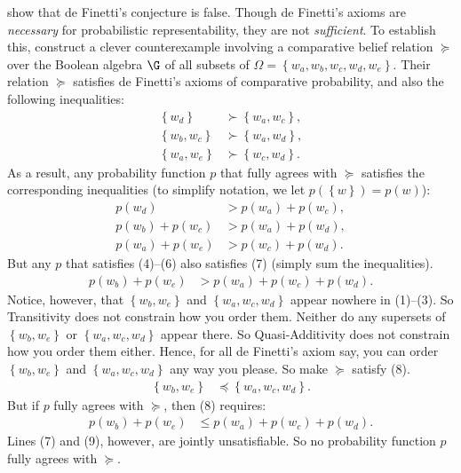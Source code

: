 \citet{Kraft1959} show that de Finetti's conjecture is false. Though de Finetti's axioms are \emph{necessary} for probabilistic representability, they are not \emph{sufficient}. To establish this, \citeauthor{Kraft1959} construct a clever counterexample involving a comparative belief relation $\succeq$ over the Boolean algebra $\G$ of all subsets of $\Omega=\left\{w_a,w_b,w_c,w_d,w_e\right\}$. Their relation $\succeq$ satisfies de Finetti's axioms of comparative probability, and also the following inequalities:
\begin{align}\label{eq:1-3}
		\left\{w_d\right\} & \succ  \left\{w_a,w_c\right\},\\
		\left\{w_b,w_c\right\} & \succ  \left\{w_a,w_d\right\},\\
		\left\{w_a,w_e\right\} & \succ \left\{w_c,w_d\right\}.
	\end{align}	
As a result, any probability function $p$ that fully agrees with $\succeq$ satisfies the corresponding inequalities (to simplify notation, we let $p(\left\{w\right\})=p(w)$):
\begin{align}\label{eq:4-6}
		p(w_d) & >  p(w_a)+p(w_c),\\
		p(w_b)+p(w_c) & > p(w_a)+p(w_d),\\
		p(w_a)+p(w_e) & > p(w_c)+p(w_d).
	\end{align}	
But any $p$ that satisfies (4)--(6) also satisfies (7) (simply sum the inequalities).
\begin{align}\label{eq:7}
		p(w_b)+p(w_e) & > p(w_a)+p(w_c)+p(w_d).
	\end{align}	
Notice, however, that $\left\{w_b,w_e\right\}$ and $\left\{w_a,w_c,w_d\right\}$ appear nowhere in (1)--(3). So Transitivity does not constrain how you order them. Neither do any supersets of $\left\{w_b,w_e\right\}$ or $\left\{w_a,w_c,w_d\right\}$ appear there. So Quasi-Additivity does not constrain how you order them either. Hence, for all de Finetti's axiom say, you can order $\left\{w_b,w_e\right\}$ and $\left\{w_a,w_c,w_d\right\}$ any way you please. So \citeauthor{Kraft1959} make $\succeq$ satisfy (8).
\begin{align}\label{eq:8}
		\left\{w_b,w_e\right\} & \preceq \left\{w_a,w_c,w_d\right\}.
	\end{align}
But if $p$ fully agrees with $\succeq$, then (8) requires:
\begin{align}\label{eq:9}
		p(w_b)+p(w_e) & \leq p(w_a)+p(w_c)+p(w_d).
	\end{align}
Lines (7) and (9), however, are jointly unsatisfiable. So no probability function $p$ fully agrees with $\succeq$.



